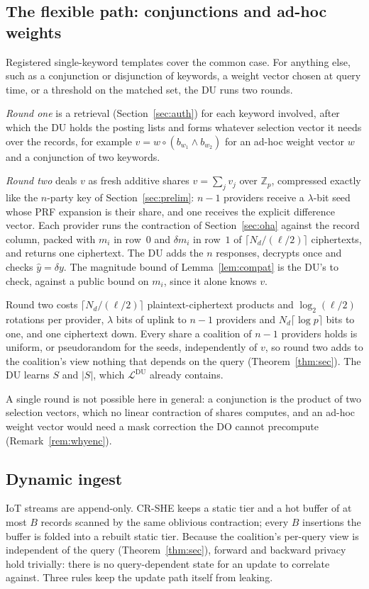 \documentclass[a4paper,fleqn]{cas-sc}
\newcommand{\Leak}{\mathcal{L}}
\begin{document}
\subsection{The flexible path: conjunctions and ad-hoc weights}
\label{sec:flex}
Registered single-keyword templates cover the common case. For anything else,
such as a conjunction or disjunction of keywords, a weight vector chosen at
query time, or a threshold on the matched set, the DU runs two rounds.

\emph{Round one} is a retrieval (Section~\ref{sec:auth}) for each keyword
involved, after which the DU holds the posting lists and forms whatever
selection vector it needs over the records, for example
$v=w\circ(b_{w_1}\wedge b_{w_2})$ for an ad-hoc weight vector $w$ and a
conjunction of two keywords.

\emph{Round two} deals $v$ as fresh additive shares $v=\sum_jv_j$ over
$\mathbb{Z}_p$, compressed exactly like the $n$-party key of
Section~\ref{sec:prelim}: $n-1$ providers receive a $\lambda$-bit seed whose
PRF expansion is their share, and one receives the explicit difference vector.
Each provider runs the contraction of Section~\ref{sec:oha} against the record
column, packed with $m_i$ in row~$0$ and $\delta m_i$ in row~$1$ of
$\lceil N_d/(\ell/2)\rceil$ ciphertexts, and returns one ciphertext. The DU
adds the $n$ responses, decrypts once and checks $\hat y=\delta y$. The
magnitude bound of Lemma~\ref{lem:compat} is the DU's to check, against a
public bound on $m_i$, since it alone knows $v$.

Round two costs $\lceil N_d/(\ell/2)\rceil$ plaintext-ciphertext products and
$\log_2(\ell/2)$ rotations per provider, $\lambda$ bits of uplink to $n-1$
providers and $N_d\lceil\log p\rceil$ bits to one, and one ciphertext down.
Every share a coalition of $n-1$ providers holds is uniform, or pseudorandom
for the seeds, independently of $v$, so round two adds to the coalition's view
nothing that depends on the query (Theorem~\ref{thm:sec}). The DU learns $S$
and $|S|$, which $\Leak^{\text{DU}}$ already contains.

A single round is not possible here in general: a conjunction is the product
of two selection vectors, which no linear contraction of shares computes, and
an ad-hoc weight vector would need a mask correction the DO cannot precompute
(Remark~\ref{rem:whyenc}).

\subsection{Dynamic ingest}
\label{sec:ingest}
IoT streams are append-only. CR-SHE keeps a static tier and a hot buffer of at
most $B$ records scanned by the same oblivious contraction; every $B$
insertions the buffer is folded into a rebuilt static tier. Because the
coalition's per-query view is independent of the query
(Theorem~\ref{thm:sec}), forward and backward privacy hold trivially: there is
no query-dependent state for an update to correlate against. Three rules keep
the update path itself from leaking.
\end{document}

